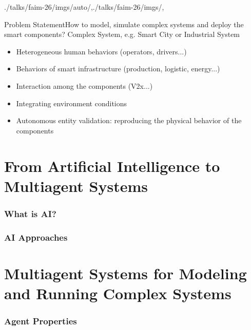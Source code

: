 \localized

\begin{bibliographysection}
\begin{graphicspathcontext}{{./talks/faim-26/imgs/auto/},{./talks/faim-26/imgs/},\old}

\begin{righttitleframe}{Problem Statement}{How to model, simulate complex systems and deploy the smart components?}
	{\larger Complex System, e.g. Smart City or Industrial System}
	\begin{itemize}
		\item Heterogeneous human behaviors (operators, drivers...)
		\item Behaviors of smart infrastructure (production, logistic, energy...)
		\item Interaction among the components (V2x...)
		\item Integrating environment conditions
		\item Autonomous entity validation: reproducing the physical behavior of the components
	\end{itemize}
\end{righttitleframe}

\tableofcontentslide[onlyparts]

\part{From Artificial Intelligence to Multiagent Systems}

\section{What is AI?}
\localized

\section{AI Approaches}
\localized
\localized

\part{Multiagent Systems for Modeling and Running Complex Systems}

\section{Agent Properties}


\end{graphicspathcontext}
\end{bibliographysection}
